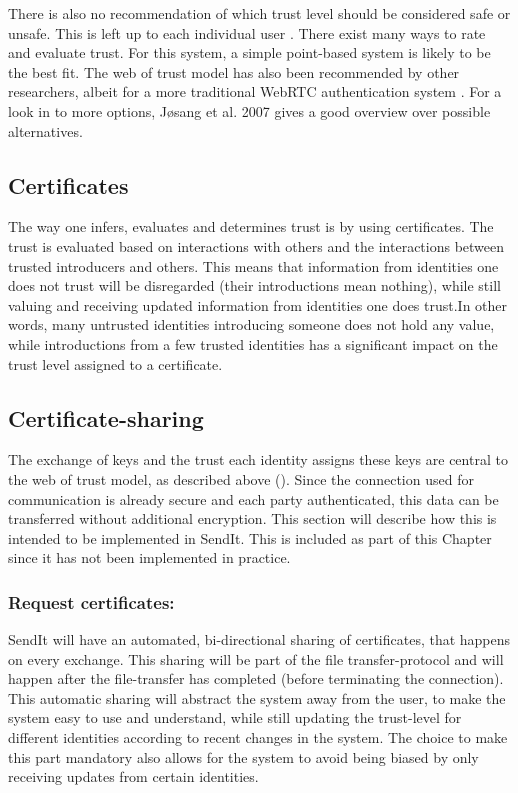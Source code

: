    There is also no recommendation of which trust level should be considered safe or unsafe. This is left up to each individual user \cite{ar_pgp}. There exist many ways to rate and evaluate trust. For this system, a simple point-based system is likely to be the best fit. The web of trust model has also been recommended by other researchers, albeit for a more traditional WebRTC authentication system \cite{ar_whois}. For a look in to more options, J\o sang et al. 2007 \cite{a_trustserv} gives a good overview over possible alternatives.

    \subsection{Certificates}
    The way one infers, evaluates and determines trust is by using certificates. The trust is evaluated based on interactions with others and the interactions between trusted introducers and others. This means that information from identities one does not trust will be disregarded (their introductions mean nothing), while still valuing and receiving updated information from identities one does trust.In other words, many untrusted identities introducing someone does not hold any value, while introductions from a few trusted identities has a significant impact on the trust level assigned to a certificate.

    \subsection{Certificate-sharing}
    The exchange of keys and the trust each identity assigns these keys are central to the web of trust model, as described above (). Since the connection used for communication is already secure and each party authenticated, this data can be transferred without additional encryption. This section will describe how this is intended to be implemented in SendIt. This is included as part of this Chapter since it has not been implemented in practice.
        \subsubsection*{Request certificates:}
        SendIt will have an automated, bi-directional sharing of certificates, that happens on every exchange. This sharing will be part of the file transfer-protocol and will happen after the file-transfer has completed (before terminating the connection). This automatic sharing will abstract the system away from the user, to make the system easy to use and understand, while still updating the trust-level for different identities according to recent changes in the system. The choice to make this part mandatory also allows for the system to avoid being biased by only receiving updates from certain identities.

